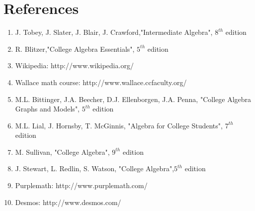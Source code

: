 \chapter{References}
%
\thispagestyle{empty}
%
\begin{enumerate}
	\item	J. Tobey, J. Slater, J. Blair, J. Crawford,"Intermediate Algebra", $8^{th}$ edition
	\item R. Blitzer,"College Algebra Essentials", $5^{th}$ edition
	\item Wikipedia: http://www.wikipedia.org/
	\item Wallace math course: http://www.wallace.ccfaculty.org/	
	\item M.L. Bittinger, J.A. Beecher, D.J. Ellenborgen, J.A. Penna, "College Algebra Graphs and Models", $5^{th}$ edition
	\item M.L. Lial, J. Hornsby, T. McGinnis, "Algebra for College Students", $7^{th}$ edition
	\item M. Sullivan, "College Algebra", $9^{th}$ edition
	\item J. Stewart, L. Redlin, S. Watson, "College Algebra",$5^{th}$ edition
	\item Purplemath: http://www.purplemath.com/
	\item Desmos: http://www.desmos.com/
\end{enumerate}